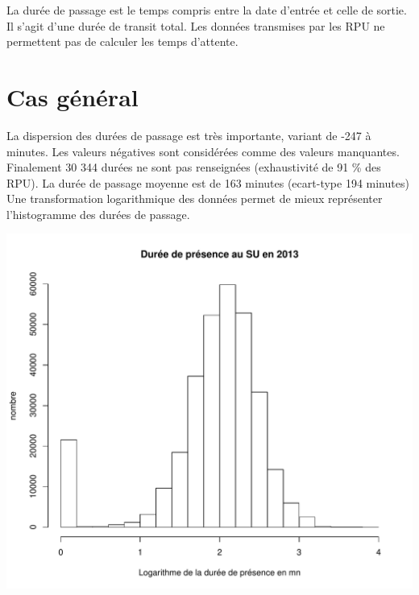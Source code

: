 \documentclass[12pt,english,french,twoside]{book}\usepackage[]{graphicx}\usepackage[]{color}
\makeatletter
\def\maxwidth{ %
  \ifdim\Gin@nat@width>\linewidth
    \linewidth
  \else
    \Gin@nat@width
  \fi
}
\newenvironment{knitrout}{}{} %
\makeatother
\begin{document}

La durée de passage est le temps compris entre la date d'entrée et celle de sortie. Il s'agit d'une durée de transit total. Les données transmises par les RPU ne permettent pas de calculer les temps d'attente.


\section{Cas général}




La dispersion des durées de passage est très importante, variant de -247 à  minutes. Les valeurs négatives sont considérées comme des valeurs manquantes. 
Finalement 30 344 durées ne sont pas renseignées (exhaustivité de 91 \% des RPU). 
La durée de passage moyenne est de 163 minutes (ecart-type 194 minutes)
Une transformation logarithmique des données permet de mieux représenter l'histogramme des durées de passage. 

\begin{center}
\begin{knitrout}
\color{fgcolor}
\includegraphics[width=\maxwidth]{figure/log_passages} 

\end{knitrout}

\end{center}
\end{document}
